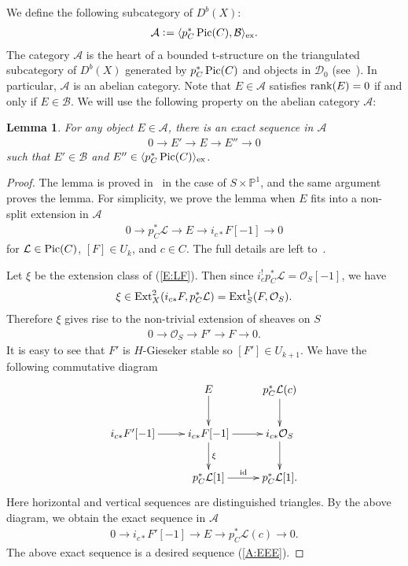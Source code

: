 \documentclass[11pt]{amsart}
\theoremstyle{plain}
\newtheorem{lem}[thm]{Lemma}
\newcommand{\aA}{\mathcal{A}}
\newcommand{\bB}{\mathcal{B}}
\newcommand{\dD}{\mathcal{D}}
\newcommand{\lL}{\mathcal{L}}
\newcommand{\oO}{\mathcal{O}}
\newcommand{\Pic}{\mathop{\rm Pic}\nolimits}
\newcommand{\id}{\textrm{id}}
\newcommand{\Ext}{\mathop{\rm Ext}\nolimits}
\newcommand{\rank}{\mathop{\rm rank}\nolimits}
\begin{document}
We define the following subcategory
of $D^b(X)$:
\begin{align}\label{def:aA}
\aA \cneq \langle p_C^{\ast}\Pic(C), \bB \rangle_{\rm{ex}}. 
\end{align}
The category $\aA$ is the heart of a bounded t-structure on the 
triangulated subcategory of 
$D^b(X)$ generated by 
$p_C^{\ast}\Pic(C)$ and objects in $\dD_0$
 (see~\cite[Proposition~2.9]{TodK3}). 
In particular, $\aA$ is 
an abelian category. 
Note that $E \in \aA$ satisfies 
$\rank(E)=0$ if and only if $E \in \bB$. 
We will use the following property on the 
abelian category $\aA$: 
\begin{lem}\label{A:exact}
For any object $E \in \aA$, there is an exact sequence
in $\aA$
\begin{align}\label{A:EEE}
0 \to E' \to E \to E'' \to 0
\end{align}
such that $E' \in \bB$ and 
$E'' \in \langle p_C^{\ast}\Pic(C) \rangle_{\rm{ex}}$. 
\end{lem}
\begin{proof}
The lemma is proved in~\cite[Lemma~7.5]{TodK3}
in the case of $S \times \mathbb{P}^1$, and 
the same argument proves the lemma. 
For simplicity, we prove the lemma 
when $E$ fits into a non-split extension
in $\aA$
\begin{align}\label{E:LF}
0 \to 
p_C^{\ast} \lL \to E \to i_{c\ast}F[-1]
\to 0
\end{align}
for $\lL \in \Pic(C)$, $[F] \in U_k$, 
and $c \in C$. 
The full details are left
to~\cite[Lemma~7.5]{TodK3}. 

Let $\xi$ be the extension class of (\ref{E:LF}). Then 
since $i_c^{!}p_C^{\ast}\lL=\oO_S[-1]$, we have 
\begin{align*}
\xi \in \Ext^2_X(i_{c\ast}F, p_C^{\ast}\lL)
=\Ext_S^1(F, \oO_S). 
\end{align*}
Therefore $\xi$ gives rise to the non-trivial 
extension of sheaves on $S$
\begin{align*}
0 \to \oO_S \to F' \to F \to 0.
\end{align*}
It is easy to see that $F'$ is 
$H$-Gieseker stable so $[F'] \in U_{k+1}$. 
We have the following commutative diagram
\begin{align*}
\xymatrix{
&  E \ar[d] & p_C^{\ast}\lL(c) \ar[d] \\
i_{c\ast}F'[-1] \ar[r] & i_{c\ast}F[-1] \ar[r] \ar[d]^-{\xi} 
& i_{c\ast}\oO_S \ar[d] \\
& p_C^{\ast}\lL[1] \ar[r]^-{\id} & p_C^{\ast}\lL[1]. 
}
\end{align*}
Here horizontal and vertical sequences are distinguished 
triangles. 
By the above diagram, we obtain the exact sequence
in $\aA$
\begin{align*}
0 \to 
i_{c\ast}F'[-1] \to E \to p_C^{\ast}\lL(c) \to 0.
\end{align*}
The above exact sequence is 
a desired sequence (\ref{A:EEE}). 
\end{proof}
\end{document}
